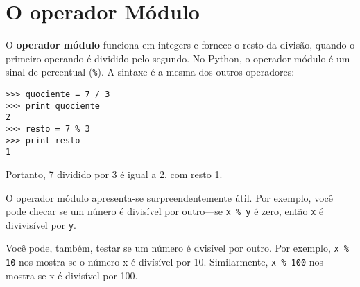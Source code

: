 \section{O operador Módulo}


O {\bf operador módulo} funciona em integers e fornece o resto da divisão,
quando o primeiro operando é dividido pelo segundo. No Python, o 
operador módulo é um sinal de percentual (\verb"%"). A sintaxe é a mesma 
dos outros operadores:

\beforeverb
\begin{verbatim}
>>> quociente = 7 / 3
>>> print quociente
2
>>> resto = 7 % 3
>>> print resto
1
\end{verbatim}
\afterverb
%

Portanto, 7 dividido por 3 é igual a 2, com resto 1.

O operador módulo apresenta-se surpreendentemente útil. Por 
exemplo, você pode checar se um núnero é divisível por outro---se 
{\tt x \% y} é zero, então {\tt x} é divivisível por {\tt y}.


Você pode, também, testar se um número é dvisível por outro. 
Por exemplo, {\tt x \% 10} nos mostra se o número x é
divísível por 10. Similarmente, {\tt x \% 100}
nos mostra se x é divisível por 100.

